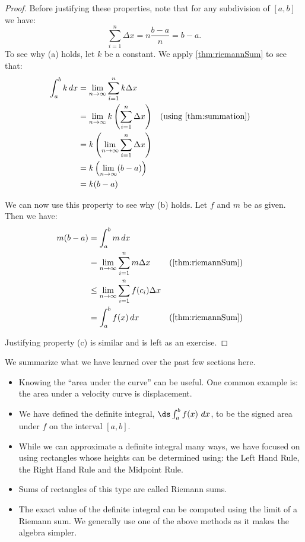 
\begin{proof}
Before justifying these properties, note that for any subdivision of $[a,b]$ we have: \[\sum_{i=1}^n \Delta x=n\frac{b-a}n=b-a.\]
To see why (a) holds, let $k$ be a constant. We apply \autoref{thm:riemannSum} to see that:
\begin{align*}
\int_a^b k\,dx &=\lim_{n\to\infty}\sum_{i=1}^n k\Delta x\\
&=\lim_{n\to\infty}k\left( \sum_{i=1}^n \Delta x\right)
&&\text{(using \autoref{thm:summation})}\\
&=k\left(\lim_{n\to\infty}\sum_{i=1}^n \Delta x\right)\\
&=k\left( \lim_{n\to\infty} (b-a)\right)\\
&=k(b-a)
\end{align*}

We can now use this property to see why (b) holds. Let $f$ and $m$ be as given. Then we have:
\begin{align*}
m(b-a)&=\int_a^b m\,dx \\
&=\lim_{n\to\infty}\sum_{i=1}^n m\Delta x
&&\text{(\autoref{thm:riemannSum})}\\
&\leq \lim_{n\to\infty}\sum_{i=1}^n f(c_i)\Delta x\\
&=\int_a^b f(x)\,dx &&\text{(\autoref{thm:riemannSum})}
\end{align*}

Justifying property (c) is similar and is left as an exercise.
\end{proof}

We summarize what we have learned over the past few sections here.
\begin{itemize}
\item	Knowing the ``area under the curve'' can be useful. One common example is: the area under a velocity curve is displacement.
\item	We have defined the definite integral, $\ds\int_a^b f(x)\ dx$, to be the signed area under $f$ on the interval $[a,b]$. 
\item	While we can approximate a definite integral many ways, we have focused on using rectangles whose heights can be determined using: the Left Hand Rule, the Right Hand Rule and the Midpoint Rule. 
\item	Sums of rectangles of this type are called Riemann sums.
\item	The exact value of the definite integral can be computed using the limit of a Riemann sum. We generally use one of the above methods as it makes the algebra simpler.
\end{itemize}

